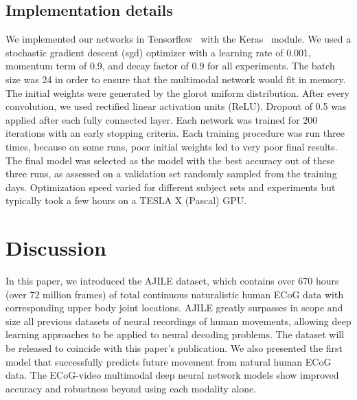 \documentclass[letterpaper]{article} %
\begin{document}
\subsection{Implementation details}

We implemented our networks in Tensorflow~\cite{tensorflow2015-whitepaper} with the Keras~\cite{chollet2015keras} module. 
We used a stochastic gradient descent (sgd) optimizer with a learning rate of 0.001, momentum term of 0.9, and decay factor of 0.9 for all experiments. 
The batch size was 24 in order to ensure that the multimodal network would fit in memory. 
The initial weights were generated by the glorot uniform distribution. 
After every convolution, we used rectified linear activation units (ReLU). 
Dropout of 0.5 was applied after each fully connected layer. 
Each network was trained for 200 iterations with an early stopping criteria. 
Each training procedure was run three times, because on some runs, poor initial weights led to very poor final results.
The final model was selected as the model with the best accuracy out of these three runs, as assessed on a validation set randomly sampled from the training days.
Optimization speed varied for different subject sets and experiments but typically took a few hours on a TESLA X (Pascal) GPU.


\section{Discussion}

In this paper, we introduced the AJILE dataset, which contains over 670 hours (over 72 million frames) of total continuous naturalistic human ECoG data with corresponding upper body joint locations. 
AJILE greatly surpasses in scope and size all previous datasets of neural recordings of human movements, allowing deep learning approaches to be applied to neural decoding problems. 
The dataset will be released to coincide with this paper's publication. 
We also presented the first model that successfully predicts future movement from natural human ECoG data. 
The ECoG-video multimodal deep neural network models show improved accuracy and robustness beyond using each modality alone. 

\end{document}

